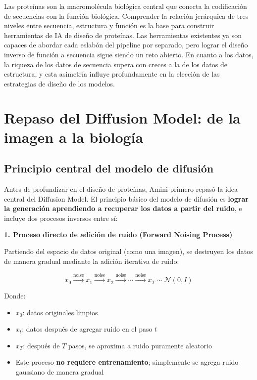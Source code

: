 \documentclass[a4paper]{article}
\begin{document}
Las proteínas son la macromolécula biológica central que conecta la codificación de secuencias con la función biológica. Comprender la relación jerárquica de tres niveles entre secuencia, estructura y función es la base para construir herramientas de IA de diseño de proteínas. Las herramientas existentes ya son capaces de abordar cada eslabón del pipeline por separado, pero lograr el diseño inverso de función a secuencia sigue siendo un reto abierto. En cuanto a los datos, la riqueza de los datos de secuencia supera con creces a la de los datos de estructura, y esta asimetría influye profundamente en la elección de las estrategias de diseño de los modelos.
\section{Repaso del Diffusion Model: de la imagen a la biología}

\subsection{Principio central del modelo de difusión}

Antes de profundizar en el diseño de proteínas, Amini primero repasó la idea central del Diffusion Model. El principio básico del modelo de difusión es \textbf{lograr la generación aprendiendo a recuperar los datos a partir del ruido}, e incluye dos procesos inversos entre sí:

\textbf{1. Proceso directo de adición de ruido (Forward Noising Process)}

Partiendo del espacio de datos original (como una imagen), se destruyen los datos de manera gradual mediante la adición iterativa de ruido:

$$x_0 \xrightarrow{\text{noise}} x_1 \xrightarrow{\text{noise}} x_2 \xrightarrow{\text{noise}} \cdots \xrightarrow{\text{noise}} x_T \sim \mathcal{N}(0, I)$$

Donde:
\begin{itemize}
    \item $x_0$: datos originales limpios
    \item $x_t$: datos después de agregar ruido en el paso $t$
    \item $x_T$: después de $T$ pasos, se aproxima a ruido puramente aleatorio
    \item Este proceso \textbf{no requiere entrenamiento}; simplemente se agrega ruido gaussiano de manera gradual
\end{itemize}
\end{document}
